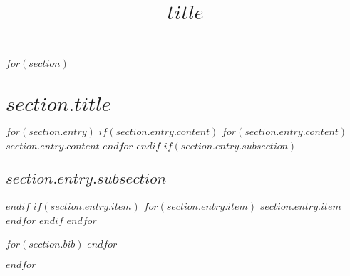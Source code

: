 \documentclass[a4paper]{moderncv}
\title{$title$}
\begin{document}
\maketitle
\nocite{*}

$for(section)$
\section{$section.title$}

$for(section.entry)$
  $if(section.entry.content)$
    \cventry
    $for(section.entry.content)$ {$section.entry.content$} $endfor$
  $endif$
  $if(section.entry.subsection)$\subsection{$section.entry.subsection$}$endif$
  $if(section.entry.item)$
    \cvitem
    $for(section.entry.item)$ {$section.entry.item$} $endfor$
  $endif$
$endfor$

$for(section.bib)$
\printbibliography[title={$section.bib.title$}, keyword=$section.bib.key$, heading=subbibliography]
$endfor$

$endfor$
\end{document}
